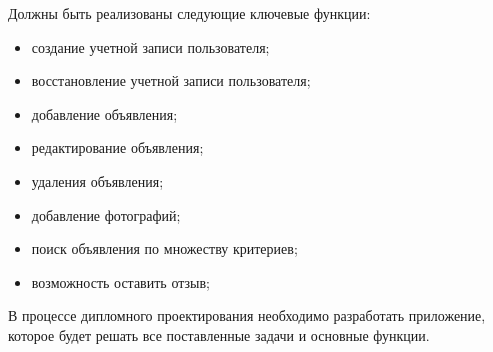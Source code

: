 Должны быть реализованы следующие ключевые функции:

\begin{itemize}
	\item создание учетной записи пользователя;
	\item восстановление учетной записи пользователя;
	\item добавление объявления;
	\item редактирование объявления;
	\item удаления  объявления;
	\item добавление фотографий;
	\item поиск объявления по множеству критериев;
	\item возможность оставить отзыв;
\end{itemize}

В процессе дипломного проектирования необходимо разработать приложение, которое будет решать все поставленные задачи и основные функции.
